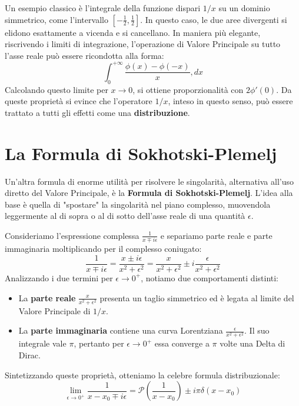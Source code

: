 Un esempio classico è l'integrale della funzione dispari $1/x$ su un dominio simmetrico, come l'intervallo $\left[-\frac{1}{2}, \frac{1}{2}\right]$. In questo caso, le due aree divergenti si elidono esattamente a vicenda e si cancellano.
In maniera più elegante, riscrivendo i limiti di integrazione, l'operazione di Valore Principale su tutto l'asse reale può essere ricondotta alla forma:
\begin{equation}
\int_0^{+\infty} \frac{\phi(x) - \phi(-x)}{x} , dx
\end{equation}
Calcolando questo limite per $x \to 0$, si ottiene proporzionalità con $2\phi'(0)$. Da queste proprietà si evince che l'operatore $1/x$, inteso in questo senso, può essere trattato a tutti gli effetti come una \textbf{distribuzione}.

\section{La Formula di Sokhotski-Plemelj}

Un'altra formula di enorme utilità per risolvere le singolarità, alternativa all'uso diretto del Valore Principale, è la \textbf{Formula di Sokhotski-Plemelj}. L'idea alla base è quella di "spostare" la singolarità nel piano complesso, muovendola leggermente al di sopra o al di sotto dell'asse reale di una quantità $\epsilon$.

Consideriamo l'espressione complessa $\frac{1}{x \mp i\epsilon}$ e separiamo parte reale e parte immaginaria moltiplicando per il complesso coniugato:
\begin{equation}
\frac{1}{x \mp i\epsilon} = \frac{x \pm i\epsilon}{x^2 + \epsilon^2} = \frac{x}{x^2 + \epsilon^2} \pm i \frac{\epsilon}{x^2 + \epsilon^2}
\end{equation}
Analizzando i due termini per $\epsilon \to 0^+$, notiamo due comportamenti distinti:
\begin{itemize}
\item La \textbf{parte reale} $\frac{x}{x^2 + \epsilon^2}$ presenta un taglio simmetrico ed è legata al limite del Valore Principale di $1/x$.
\item La \textbf{parte immaginaria} contiene una curva Lorentziana $\frac{\epsilon}{x^2 + \epsilon^2}$. Il suo integrale vale $\pi$, pertanto per $\epsilon \to 0^+$ essa converge a $\pi$ volte una Delta di Dirac.
\end{itemize}

Sintetizzando queste proprietà, otteniamo la celebre formula distribuzionale:
\begin{equation}
\lim_{\epsilon \to 0^+} \frac{1}{x - x_0 \mp i\epsilon} = \mathcal{P} \left( \frac{1}{x - x_0} \right) \pm i\pi \delta(x - x_0)
\end{equation}

